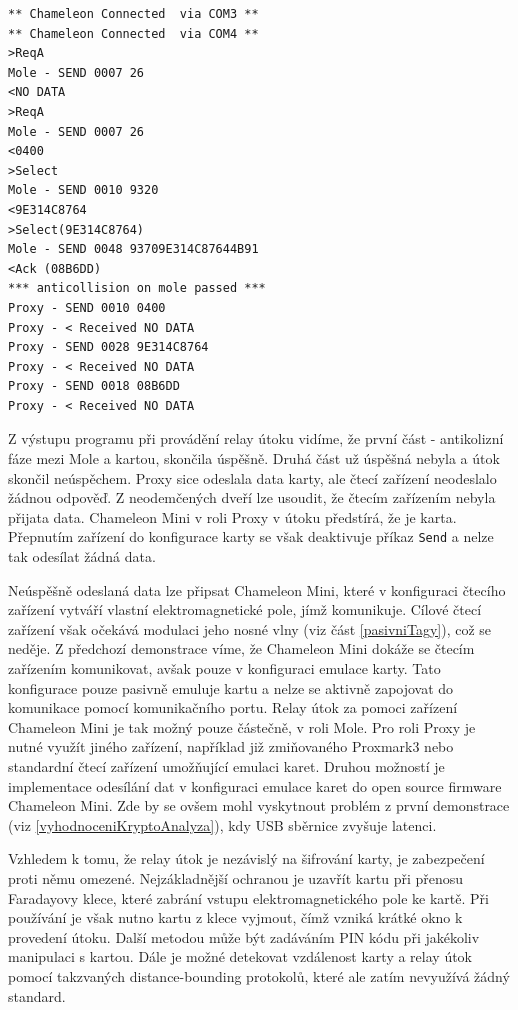 \begin{lstlisting}[caption=Výstup programu MifareProxy.exe při demonstraci, label={relayZaznam}]
** Chameleon Connected  via COM3 **
** Chameleon Connected  via COM4 **
>ReqA
Mole - SEND 0007 26
<NO DATA
>ReqA
Mole - SEND 0007 26
<0400
>Select
Mole - SEND 0010 9320
<9E314C8764
>Select(9E314C8764)
Mole - SEND 0048 93709E314C87644B91
<Ack (08B6DD)
*** anticollision on mole passed ***
Proxy - SEND 0010 0400
Proxy - < Received NO DATA
Proxy - SEND 0028 9E314C8764
Proxy - < Received NO DATA
Proxy - SEND 0018 08B6DD
Proxy - < Received NO DATA
\end{lstlisting}
Z výstupu programu při provádění relay útoku vidíme, že první část - antikolizní fáze mezi Mole a kartou, skončila úspěšně. Druhá část už úspěšná nebyla a útok skončil neúspěchem. Proxy sice odeslala data karty, ale čtecí zařízení neodeslalo žádnou odpověď. Z neodemčených dveří lze usoudit, že čtecím zařízením nebyla přijata data. Chameleon Mini v roli Proxy v útoku předstírá, že je karta. Přepnutím zařízení do konfigurace karty se však deaktivuje příkaz \verb|Send| a nelze tak odesílat žádná data. \par
Neúspěšně odeslaná data lze připsat Chameleon Mini, které v konfiguraci čtecího zařízení vytváří vlastní elektromagnetické pole, jímž komunikuje. Cílové čtecí zařízení však očekává modulaci jeho nosné vlny (viz část \ref{pasivniTagy}), což se neděje. Z předchozí demonstrace víme, že Chameleon Mini dokáže se čtecím zařízením komunikovat, avšak pouze v konfiguraci emulace karty. Tato konfigurace pouze pasivně emuluje kartu a nelze se aktivně zapojovat do komunikace pomocí komunikačního portu. Relay útok za pomoci zařízení Chameleon Mini je tak možný pouze částečně, v roli Mole. Pro roli Proxy je nutné využít jiného zařízení, například již zmiňovaného Proxmark3 nebo standardní čtecí zařízení umožňující emulaci karet. Druhou možností je implementace odesílání dat v konfiguraci emulace karet do open source firmware Chameleon Mini. Zde by se ovšem mohl vyskytnout problém z první demonstrace (viz \ref{vyhodnoceniKryptoAnalyza}), kdy USB sběrnice zvyšuje latenci.\par
Vzhledem k tomu, že relay útok je nezávislý na šifrování karty, je zabezpečení proti němu omezené. Nejzákladnější ochranou je uzavřít kartu při přenosu Faradayovy klece, které zabrání vstupu elektromagnetického pole ke kartě. Při používání je však nutno kartu z klece vyjmout, čímž vzniká krátké okno k provedení útoku. Další metodou může být zadáváním PIN kódu při jakékoliv manipulaci s kartou. Dále je možné detekovat vzdálenost karty a relay útok pomocí takzvaných {distance-bounding} protokolů, které ale zatím nevyužívá žádný standard.

